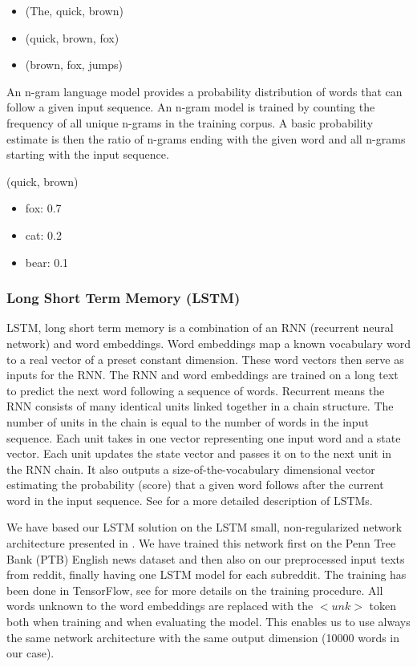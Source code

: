 \documentclass[12pt,a4paper,utf8]{article}
\begin{document}
\begin{itemize}
\item (The, quick, brown)
\item (quick, brown, fox)
\item (brown, fox, jumps)
\end{itemize}

An n-gram language model provides a probability distribution of words that can follow a given input sequence. An n-gram model is trained by counting the frequency of all unique n-grams in the training corpus. A basic probability estimate is then the ratio of n-grams ending with the given word and all n-grams starting with the input sequence. 

(quick, brown)
\begin{itemize}
\item fox: 0.7
\item cat: 0.2
\item bear: 0.1
\end{itemize}

\subsubsection{Long Short Term Memory (LSTM)}

LSTM, long short term memory is a combination of an RNN (recurrent neural network) and word embeddings. Word embeddings map a known vocabulary word to a real vector of a preset constant dimension. These word vectors then serve as inputs for the RNN. The RNN and word embeddings are trained on a long text to predict the next word following a sequence of words. Recurrent means the RNN consists of many identical units linked together in a chain structure. The number of units in the chain is equal to the number of words in the input sequence. Each unit takes in one vector representing one input word and a state vector. Each unit updates the state vector and passes it on to the next unit in the RNN chain. It also outputs a size-of-the-vocabulary dimensional vector estimating the probability (score) that a given word follows after the current word in the input sequence. See \cite{LSTM} for a more detailed description of LSTMs.

We have based our LSTM solution on the LSTM small, non-regularized network architecture presented in \cite{Zaremba14}. We have trained this network first on the Penn Tree Bank (PTB) English news dataset \cite{PTB} and then also on our preprocessed input texts from reddit, finally having one LSTM model for each subreddit. The training has been done in TensorFlow, see \cite{TensorFlow} for more details on the training procedure. All words unknown to the word embeddings are replaced with the $<unk>$ token both when training and when evaluating the model. This enables us to use always the same network architecture with the same output dimension (10000 words in our case).
\end{document}
